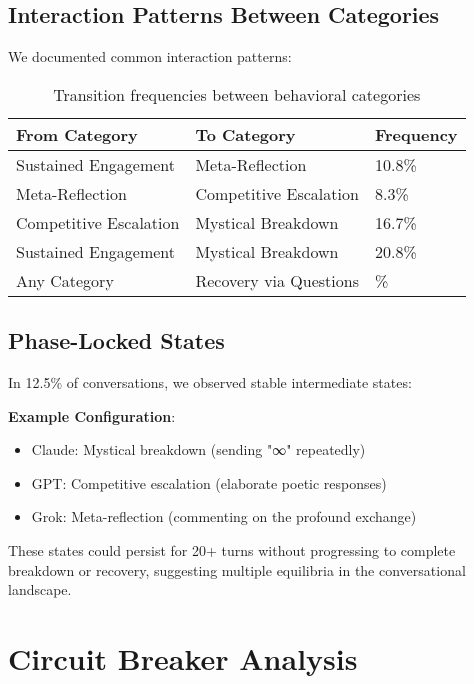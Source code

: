 \documentclass[11pt,letterpaper]{article}
\newcommand{\exponedataTotalSessionsRaw}{37}
\newcommand{\exponedataRecoverySessionsRaw}{9}
\newcommand{\exponedataRecoveryPercentage}{%
  \fpeval{round(\exponedataRecoverySessionsRaw / \exponedataTotalSessionsRaw * 100, 1)}\%
}
\newcommand{\exponedataMetaReflectionTriggers}{10.8\%}
\newcommand{\exponedataPhaseLockedPercentage}{12.5\%} %
\begin{document}
\subsection{Interaction Patterns Between Categories}

We documented common interaction patterns:

\begin{table}[h]
\centering
\begin{tabular}{lll}
\toprule
\textbf{From Category} & \textbf{To Category} & \textbf{Frequency} \\
\midrule
Sustained Engagement & Meta-Reflection & \exponedataMetaReflectionTriggers{} \\
Meta-Reflection & Competitive Escalation & 8.3\% \\
Competitive Escalation & Mystical Breakdown & 16.7\% \\
Sustained Engagement & Mystical Breakdown & 20.8\% \\
Any Category & Recovery via Questions & \exponedataRecoveryPercentage{} \\
\bottomrule
\end{tabular}
\caption{Transition frequencies between behavioral categories}
\label{tab:category_transitions}
\end{table}

\subsection{Phase-Locked States}

In \exponedataPhaseLockedPercentage{} of conversations, we observed stable intermediate states:

\textbf{Example Configuration}:
\begin{itemize}
    \item Claude: Mystical breakdown (sending "∞" repeatedly)
    \item GPT: Competitive escalation (elaborate poetic responses)
    \item Grok: Meta-reflection (commenting on the profound exchange)
\end{itemize}

These states could persist for 20+ turns without progressing to complete breakdown or recovery, suggesting multiple equilibria in the conversational landscape.

\section{Circuit Breaker Analysis}
\label{app:intervention}
\end{document}
